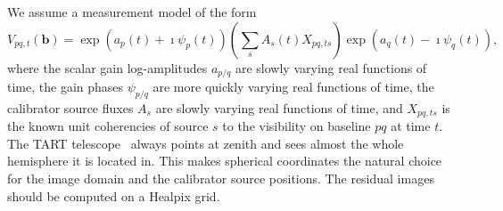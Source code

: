\documentclass[11pt]{article}
\begin{document}
We assume a measurement model of the form
\begin{equation}
  V_{pq,t}(\bm{b}) = \exp\left(a_p(t) + \imath \psi_p(t)\right) \left( \sum_s A_s(t) X_{pq,ts} \right) \exp\left(a_q(t) - \imath \psi_q(t)\right),
\end{equation}
where the scalar gain log-amplitudes $a_{p/q}$ are slowly varying real functions of time, the gain phases $\psi_{p/q}$ are more quickly varying real functions of time, the calibrator source fluxes $A_s$ are slowly varying real functions of time, and $X_{pq,ts}$ is the known unit coherencies of source $s$ to the visibility on baseline $pq$ at time $t$. The TART telescope~\cite{tart} always points at zenith and sees almost the whole hemisphere it is located in. This makes spherical coordinates the natural choice for the image domain and the calibrator source positions. The residual images should be computed on a Healpix grid.
\end{document}

